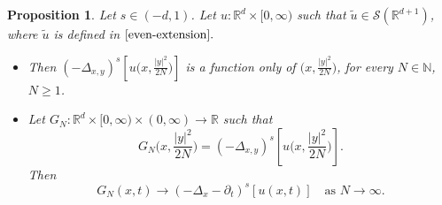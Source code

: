 \documentclass[11pt, twoside, notitlepage]{amsart}
\newtheorem{proposition}[theorem]{Proposition}
\newcommand\R{\mathbb{R}}
\numberwithin{equation}{section}
\begin{document}
\begin{proposition}\label{prop:transf} Let $s \in (-d,1)$.  Let $u : \R^d \times [0,\infty)$ such that $\tilde{u} \in \mathcal{S}(\R^{d+1})$,  where $\tilde{u}$  is defined in $\eqref{even-extension}.$
   \begin{itemize}
     \item[(i)]Then   $(-\Delta_{x,y})^s \left[ u\big(x,\frac{|y|^2}{2N}\big)  \right]$ is a function only of $\big(x,\frac{|y|^2}{2N}\big)$, for every $N\in  \mathbb{N}$, $N\ge 1$. \\[1mm]
  \item[(ii)]  Let   $G_N:\R^d \times [0,\infty) \times (0,\infty) \to \R$  such that
  $$G_N\big(x, \frac{|y|^2}{2N}  \big)= (-\Delta_{x,y})^s \left[ u\big(x,\frac{|y|^2}{2N}\big)  \right] .$$
  \noindent Then
  $$G_{N} (x,t) \rightarrow  ( -\Delta_x-\partial_t)^{s} [u(x,t)] \quad \text{as }N\to \infty. $$
   \end{itemize}
  \end{proposition}
\end{document}
